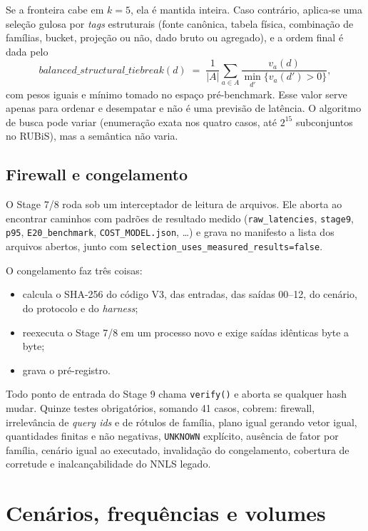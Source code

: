 \documentclass[10pt,a4paper,twoside]{article}
\theoremstyle{definition}\newtheorem{definicao}{Definição}
\begin{document}
Se a fronteira cabe em $k=5$, ela é mantida inteira. Caso contrário, aplica-se uma seleção gulosa por \emph{tags}
estruturais (fonte canônica, tabela física, combinação de famílias, bucket, projeção ou não, dado bruto ou agregado),
e a ordem final é dada pelo
\[
\textit{balanced\_structural\_tiebreak}(d) \;=\; \frac{1}{|A|}\sum_{a\in A}\frac{v_a(d)}{\min_{d'}\{v_a(d')>0\}},
\]
com pesos iguais e mínimo tomado no espaço pré-benchmark. Esse valor serve apenas para ordenar e desempatar e não é uma
previsão de latência. O algoritmo de busca pode variar (enumeração exata nos quatro casos, até $2^{15}$ subconjuntos no
RUBiS), mas a semântica não varia.

\subsection{Firewall e congelamento}
O Stage 7/8 roda sob um interceptador de leitura de arquivos. Ele aborta ao encontrar caminhos com padrões de resultado
medido (\texttt{raw\_latencies}, \texttt{stage9}, \texttt{p95}, \texttt{E20\_benchmark}, \texttt{COST\_MODEL.json}, \ldots) e
grava no manifesto a lista dos arquivos abertos, junto com \texttt{selection\_uses\_measured\_results=false}.

O congelamento faz três coisas:
\begin{itemize}
\item calcula o SHA-256 do código V3, das entradas, das saídas 00--12, do cenário, do protocolo e do \emph{harness};
\item reexecuta o Stage 7/8 em um processo novo e exige saídas idênticas byte a byte;
\item grava o pré-registro.
\end{itemize}
Todo ponto de entrada do Stage 9 chama \texttt{verify()} e aborta se qualquer hash mudar. Quinze testes obrigatórios,
somando 41 casos, cobrem: firewall, irrelevância de \emph{query ids} e de rótulos de família, plano igual gerando vetor
igual, quantidades finitas e não negativas, \texttt{UNKNOWN} explícito, ausência de fator por família, cenário igual ao
executado, invalidação do congelamento, cobertura de corretude e inalcançabilidade do NNLS legado.

\section{Cenários, frequências e volumes}
\label{sec:cenarios}
\end{document}
